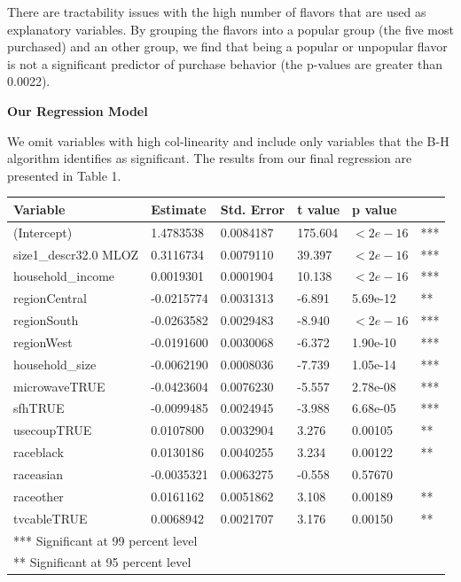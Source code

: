 \documentclass[11pt, fleqn]{article}
\begin{document}
There are tractability issues with the high number of flavors that are used as explanatory variables. By grouping the flavors into a popular group (the five most purchased) and an other group, we find that being a popular or unpopular flavor is not a significant predictor of purchase behavior (the p-values are greater than 0.0022).

\textbf{Our Regression Model}

We omit variables with high col-linearity and include only variables that the B-H algorithm identifies as significant. The results from our final regression are presented in Table 1.

\begin{tabular}{l l l l l l}
\toprule
  Variable            & Estimate  & Std. Error &  t value  & p value & \\ 
\midrule
(Intercept)           & 1.4783538 & 0.0084187 & 175.604 & $<2e-16$ & ***\\
size1\_descr32.0 MLOZ  & 0.3116734 & 0.0079110 & 39.397 & $<2e-16$ & *** \\
household\_income      & 0.0019301 & 0.0001904 & 10.138 & $<2e-16$ & *** \\
regionCentral         & -0.0215774 & 0.0031313 & -6.891 & 5.69e-12 & ** \\
regionSouth           & -0.0263582 & 0.0029483 & -8.940 & $<2e-16$ & *** \\
regionWest            & -0.0191600 & 0.0030068 & -6.372 & 1.90e-10 & *** \\
household\_size        & -0.0062190 & 0.0008036 & -7.739 & 1.05e-14 & *** \\
microwaveTRUE         & -0.0423604 & 0.0076230 & -5.557 & 2.78e-08 & *** \\
sfhTRUE               & -0.0099485 & 0.0024945 & -3.988 & 6.68e-05 & *** \\
usecoupTRUE           & 0.0107800 & 0.0032904 & 3.276 & 0.00105 & **  \\
raceblack             & 0.0130186 & 0.0040255 & 3.234 & 0.00122 & **  \\
raceasian             & -0.0035321 & 0.0063275 & -0.558 & 0.57670 & \\
raceother             & 0.0161162 & 0.0051862 & 3.108 & 0.00189 & **  \\
tvcableTRUE           & 0.0068942 & 0.0021707 & 3.176 & 0.00150 & **  \\
\midrule
\multicolumn{6}{l}{*** Significant at 99 percent level}\\
\multicolumn{6}{l}{** Significant at 95 percent level}\\
\bottomrule
\end{tabular}
\end{document}
